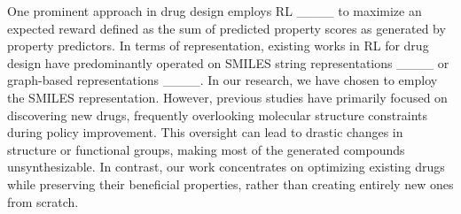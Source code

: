 One prominent approach in drug design employs RL ____ to maximize an expected reward defined as the sum of predicted property scores as generated by property predictors. 
In terms of representation, existing works in RL for drug design have predominantly operated on SMILES string representations ____ or graph-based representations ____.
In our research, we have chosen to employ the SMILES representation.
However, previous studies have primarily focused on discovering new drugs, frequently overlooking molecular structure constraints during policy improvement. This oversight can lead to drastic changes in structure or functional groups, making most of the generated compounds unsynthesizable. In contrast, our work concentrates on optimizing existing drugs while preserving their beneficial properties, rather than creating entirely new ones from scratch.










